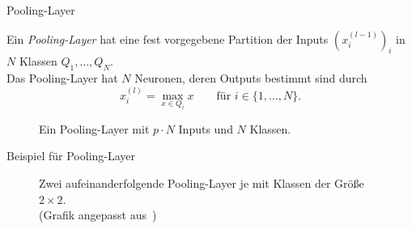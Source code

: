 \documentclass[envcountsect, smaller, aspectratio=149]{beamer}
\begin{document}
\begin{frame}{Pooling-Layer}
    \begin{minipage}{.575\textwidth}
        \vspace{-2em}
        \begin{definition}
            Ein \emph{Pooling-Layer} hat eine fest vorgegebene Partition der Inputs $(x^{(l-1)}_i)_i$ in $N$ Klassen $Q_1,\dots,Q_N$.\\[.5em]

            Das Pooling-Layer hat $N$ Neuronen, deren Outputs bestimmt sind durch
            \[
                x^{(l)}_i = \max_{ x\in Q_i } x \qquad \text{für $i\in\{1,\dots,N\}$.}
            \] 
        \end{definition}
    \end{minipage}\hfill
    \begin{minipage}{0.35\textwidth}
    \begin{figure}
        
        \caption{Ein Pooling-Layer mit $p\cdot N$ Inputs und $N$ Klassen.}
    \end{figure}
    \end{minipage}
\end{frame}

\begin{frame}{Beispiel für Pooling-Layer}
    \begin{figure}
        
        \caption{Zwei aufeinanderfolgende Pooling-Layer je mit Klassen der Größe $2\times 2$.\\
        {\scriptsize (Grafik angepasst aus~\cite{Calin2020})}}
    \end{figure}
\end{frame}
\end{document}
